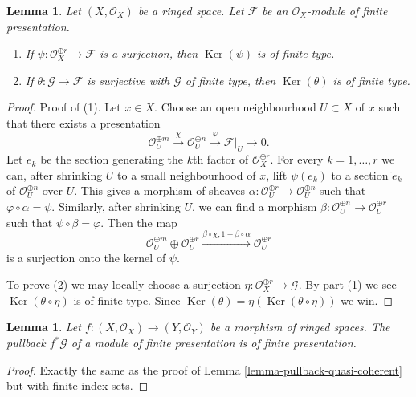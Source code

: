 \documentclass{stacks-project}
\theoremstyle{plain}
\newtheorem{lemma}[subsection]{Lemma}
\theoremstyle{definition}
\theoremstyle{remark}
\numberwithin{equation}{subsection}
\def\Ker{\mathop{\mathrm{Ker}}}
\begin{document}
\begin{lemma}
\label{lemma-kernel-surjection-finite-free-onto-finite-presentation}
Let $(X, \mathcal{O}_X)$ be a ringed space.
Let $\mathcal{F}$ be an $\mathcal{O}_X$-module of finite presentation.
\begin{enumerate}
\item If $\psi : \mathcal{O}_X^{\oplus r} \to \mathcal{F}$ is a surjection,
then $\Ker(\psi)$ is of finite type.
\item If $\theta : \mathcal{G} \to \mathcal{F}$ is surjective with
$\mathcal{G}$ of finite type, then $\Ker(\theta)$ is of finite type.
\end{enumerate}
\end{lemma}

\begin{proof}
Proof of (1).
Let $x \in X$. Choose an open neighbourhood $U \subset X$ of $x$
such that there exists a presentation
$$
\mathcal{O}_U^{\oplus m}
\xrightarrow{\chi}
\mathcal{O}_U^{\oplus n}
\xrightarrow{\varphi}
\mathcal{F}|_U
\to
0.
$$
Let $e_k$ be the section generating the $k$th factor of
$\mathcal{O}_X^{\oplus r}$. For every $k = 1, \ldots, r$
we can, after shrinking $U$ to a small neighbourhood of $x$,
lift $\psi(e_k)$ to a section $\tilde e_k$ of
$\mathcal{O}_U^{\oplus n}$ over $U$. This gives a morphism
of sheaves $\alpha : \mathcal{O}_U^{\oplus r} \to \mathcal{O}_U^{\oplus n}$
such that $\varphi \circ \alpha = \psi$.
Similarly, after shrinking $U$, we can find a morphism
$\beta : \mathcal{O}_U^{\oplus n} \to \mathcal{O}_U^{\oplus r}$
such that $\psi \circ \beta = \varphi$. Then the map
$$
\mathcal{O}_U^{\oplus m} \oplus
\mathcal{O}_U^{\oplus r}
\xrightarrow{\beta \circ \chi, 1 - \beta \circ \alpha}
\mathcal{O}_U^{\oplus r}
$$
is a surjection onto the kernel of $\psi$.

\medskip\noindent
To prove (2) we may locally choose a surjection
$\eta : \mathcal{O}_X^{\oplus r} \to \mathcal{G}$.
By part (1) we see $\Ker(\theta \circ \eta)$ is of finite type.
Since $\Ker(\theta) = \eta(\Ker(\theta \circ \eta))$ we win.
\end{proof}

\begin{lemma}
\label{lemma-pullback-finite-presentation}
Let $f : (X, \mathcal{O}_X) \to (Y, \mathcal{O}_Y)$
be a morphism of ringed spaces.
The pullback $f^*\mathcal{G}$ of a module of finite presentation
is of finite presentation.
\end{lemma}

\begin{proof}
Exactly the same as the proof of Lemma \ref{lemma-pullback-quasi-coherent}
but with finite index sets.
\end{proof}
\end{document}

